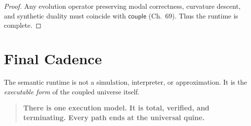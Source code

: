 \begin{proof}
Any evolution operator preserving modal correctness, curvature descent, and 
synthetic duality must coincide with $\mathsf{couple}$ (Ch.~69).  
Thus the runtime is complete.
\end{proof}

\section{Final Cadence}

The semantic runtime is not a simulation, interpreter, or 
approximation.  
It is the \emph{executable form} of the coupled universe itself.

\bigskip

\begin{quote}
\textbf{
There is one execution model.  
It is total, verified, and terminating.  
Every path ends at the universal quine.}
\end{quote}


